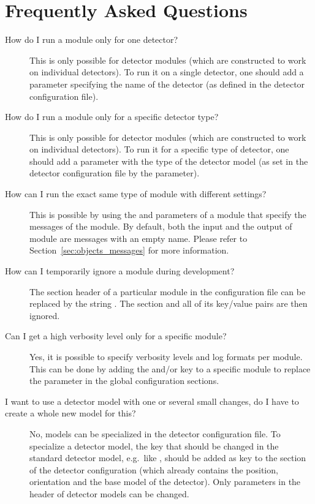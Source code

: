 \section{Frequently Asked Questions}
\label{sec:faq}
\begin{description}
\item[How do I run a module only for one detector?]
This is only possible for detector modules (which are constructed to work on individual detectors).
To run it on a single detector, one should add a parameter  specifying the name of the detector (as defined in the detector configuration file).
\item[How do I run a module only for a specific detector type?]
This is only possible for detector modules (which are constructed to work on individual detectors).
To run it for a specific type of detector, one should add a parameter  with the type of the detector model (as set in the detector configuration file by the  parameter).
\item[How can I run the exact same type of module with different settings?] This is possible by using the  and  parameters of a module that specify the messages of the module.
By default, both the input and the output of module are messages with an empty name.
Please refer to Section~\ref{sec:objects_messages} for more information.
\item[How can I temporarily ignore a module during development?]
The section header of a particular module in the configuration file can be replaced by the string .
The section and all of its key/value pairs are then ignored.
\item[Can I get a high verbosity level only for a specific module?]
Yes, it is possible to specify verbosity levels and log formats per module.
This can be done by adding the  and/or  key to a specific module to replace the parameter in the global configuration sections.
\item[I want to use a detector model with one or several small changes, do I have to create a whole new model for this?] No, models can be specialized in the detector configuration file.
To specialize a detector model, the key that should be changed in the standard detector model, e.g.\ like , should be added as key to the section of the detector configuration (which already contains the position, orientation and the base model of the detector).
Only parameters in the header of detector models can be changed.

\end{description}

